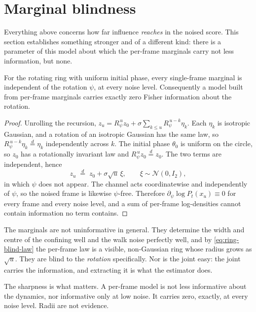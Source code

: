 \section{Marginal blindness}\label{sec:ring-blindness}

Everything above concerns how far influence \emph{reaches} in the noised score.
This section establishes something stronger and of a different kind: there is a
parameter of this model about which the per-frame marginals carry not less
information, but none.

\begin{theorem}\label{thm:ring-blindness}
For the rotating ring with uniform initial phase, every single-frame marginal
is independent of the rotation $\psi$, at every noise level. Consequently a
model built from per-frame marginals carries exactly zero Fisher information
about the rotation.
\end{theorem}

\begin{proof}
Unrolling the recursion,
$z_u = R_\psi^{\,u} z_0 + \sigma\sum_{k\le u} R_\psi^{\,u-k}\eta_k$. Each
$\eta_k$ is isotropic Gaussian, and a rotation of an isotropic Gaussian has the
same law, so $R_\psi^{\,u-k}\eta_k \stackrel{d}{=} \eta_k$ independently across $k$. The
initial phase $\theta_0$ is uniform on the circle, so $z_0$ has a rotationally
invariant law and $R_\psi^{\,u} z_0 \stackrel{d}{=} z_0$. The two terms are independent,
hence
\begin{equation}
  z_u \;\stackrel{d}{=}\; z_0 + \sigma\sqrt{u}\,\xi,
  \qquad \xi \sim \mathcal{N}(0, I_2),
  \label{eq:ring-blind-law}
\end{equation}
in which $\psi$ does not appear. The channel acts coordinatewise and
independently of $\psi$, so the noised frame is likewise $\psi$-free. Therefore
$\partial_\psi \log P_t(x_u) \equiv 0$ for every frame and every noise level,
and a sum of per-frame log-densities cannot contain information no term
contains.
\end{proof}

\begin{remark}
The marginals are not uninformative in general. They determine the width and
centre of the confining well and the walk noise perfectly well, and by
\eqref{eq:ring-blind-law} the per-frame law is a visible, non-Gaussian ring
whose radius grows as $\sqrt{u}$. They are blind to the \emph{rotation}
specifically. Nor is the joint easy: the joint carries the information, and
extracting it is what the estimator does.

The sharpness is what matters. A per-frame model is not less informative about
the dynamics, nor informative only at low noise. It carries zero, exactly, at
every noise level. Radii are not evidence.
\end{remark}

